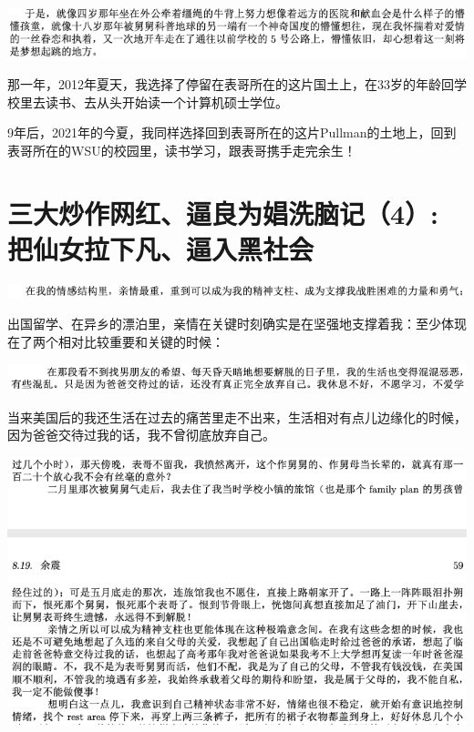 \documentclass[9pt, b5paper]{article}
\begin{document}
\begin{center}
\includegraphics[width=.9\linewidth]{./pic/backups_plans_20210414_161940.png}
\end{center}

那一年，2012年夏天，我选择了停留在表哥所在的这片国土上，在33岁的年龄回学校里去读书、去从头开始读一个计算机硕士学位。

9年后，2021年的今夏，我同样选择回到表哥所在的这片Pullman的土地上，回到表哥所在的WSU的校园里，读书学习，跟表哥携手走完余生！

\section{三大炒作网红、逼良为娼洗脑记（4）: 把仙女拉下凡、逼入黑社会}
\label{sec:org4761145}

\begin{center}
\includegraphics[width=.9\linewidth]{./pic/backups_plans_20210417_211023.png}
\end{center}

出国留学、在异乡的漂泊里，亲情在关键时刻确实是在坚强地支撑着我：至少体现在了两个相对比较重要和关键的时候：

\begin{center}
\includegraphics[width=.9\linewidth]{./pic/backups_plans_20210413_124318.png}
\end{center}

当来美国后的我还生活在过去的痛苦里走不出来，生活相对有点儿边缘化的时候，因为爸爸交待过我的话，我不曾彻底放弃自己。

\begin{center}
\includegraphics[width=.9\linewidth]{./pic/backups_plans_20210413_124604.png}
\end{center}
\end{document}
